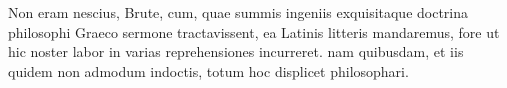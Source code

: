 Non eram nescius, Brute, cum, quae summis ingeniis exquisitaque doctrina philosophi Graeco sermone tractavissent, ea Latinis litteris mandaremus, fore ut hic noster labor in varias reprehensiones incurreret. nam quibusdam, et iis quidem non admodum indoctis, totum hoc displicet philosophari.